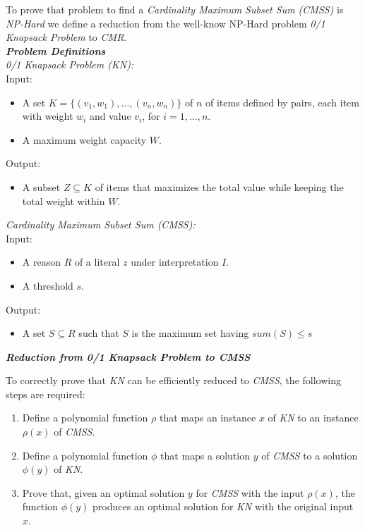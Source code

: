 To prove that problem to find a \textit{Cardinality Maximum Subset Sum (CMSS)}
is \textit{NP-Hard} we define a reduction from the well-know NP-Hard problem 
\textit{0/1 Knapsack Problem} to \textit{CMR}.\\
\textbf{\textit{Problem Definitions}}\\
\textit{0/1 Knapsack Problem (KN):}\\
Input:
    \begin{itemize}
        \item A set $K=\{(v_1,w_1),\hdots,(v_n,w_n)\}$ of \( n \) of 
        items defined by pairs, each item with weight \( w_i \) and value \( v_i \), for \( i = 1, \ldots, n \).
        \item A maximum weight capacity \( W \).
    \end{itemize}
Output:
    \begin{itemize}
        \item A subset  $Z \subseteq K$ of items that maximizes the total value while keeping the total weight within \( W \).
    \end{itemize}
\textit{Cardinality Maximum Subset Sum (CMSS):}\\
Input:
    \begin{itemize}
        \item A reason $R$ of a literal $z$ under interpretation $I$.
        \item A threshold $s$.
    \end{itemize}
Output:
    \begin{itemize}
        \item A set $S \subseteq R$ such that $S$ is the maximum set having $\mathit{sum}(S) \le s$
    \end{itemize}
\textbf{\textit{Reduction from 0/1 Knapsack Problem to CMSS}}

To correctly prove that \textit{KN} can be efficiently reduced to \textit{CMSS}, the following steps are required:

\begin{enumerate}
    \item Define a polynomial function $\rho$ that maps an instance $x$ of \textit{KN} to an instance $\rho(x)$ of \textit{CMSS}.
    \item Define a polynomial function $\phi$ that maps a solution $y$ of \textit{CMSS} to a solution $\phi(y)$ of \textit{KN}.
    \item Prove that, given an optimal solution $y$ for \textit{CMSS} with the input $\rho(x)$, the function $\phi(y)$ 
    produces an optimal solution for \textit{KN} with the original input $x$. 
\end{enumerate}


